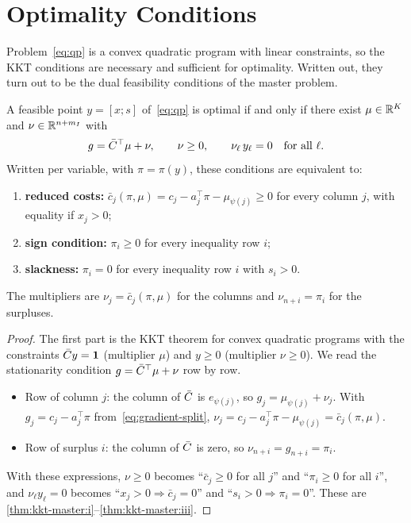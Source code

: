 \section{Optimality Conditions}
\label{sec:kkt}

Problem~\eqref{eq:qp} is a convex quadratic program with linear constraints, so the KKT
conditions are necessary and sufficient for optimality. Written out, they turn out to be the
dual feasibility conditions of the master problem.

\begin{theorem} \label{thm:kkt-master}
A feasible point $y = [x;s]$ of~\eqref{eq:qp} is optimal if and only if there exist
$\mu\in\mathbb{R}^K$ and $\nu\in\mathbb{R}^{n+m_I}$ with
\[
g = \bar{C}^\top\mu + \nu,\qquad \nu\ge0,\qquad \nu_\ell\,y_\ell = 0\quad\text{for all }\ell .
\]
Written per variable, with $\pi = \pi(y)$, these conditions are equivalent to:
\begin{enumerate}
    \item \label{thm:kkt-master:i} \textbf{reduced costs:} $\bar c_j(\pi,\mu) = c_j - a_j^\top\pi - \mu_{\psi(j)}\ge0$
          for every column $j$, with equality if $x_j>0$;
    \item \label{thm:kkt-master:ii} \textbf{sign condition:} $\pi_i\ge0$ for every inequality row $i$;
    \item \label{thm:kkt-master:iii} \textbf{slackness:} $\pi_i = 0$ for every inequality row $i$ with $s_i>0$.
\end{enumerate}
The multipliers are $\nu_j = \bar c_j(\pi,\mu)$ for the columns and $\nu_{n+i} = \pi_i$ for
the surpluses.
\end{theorem}

\begin{proof}
The first part is the KKT theorem for convex quadratic programs with the constraints
$\bar{C} y = \mathbf{1}$ (multiplier $\mu$) and $y\ge0$ (multiplier $\nu\ge0$). We read the
stationarity condition $g = \bar{C}^\top\mu + \nu$ row by row.
\begin{itemize}
    \item Row of column $j$: the column of $\bar{C}$ is $e_{\psi(j)}$, so $g_j = \mu_{\psi(j)} + \nu_j$.
          With $g_j = c_j - a_j^\top\pi$ from~\eqref{eq:gradient-split},
          $\nu_j = c_j - a_j^\top\pi - \mu_{\psi(j)} = \bar c_j(\pi,\mu)$.
    \item Row of surplus $i$: the column of $\bar{C}$ is zero, so $\nu_{n+i} = g_{n+i} = \pi_i$.
\end{itemize}
With these expressions, $\nu\ge0$ becomes ``$\bar c_j\ge0$ for all $j$'' and ``$\pi_i\ge0$ for
all $i$'', and $\nu_\ell y_\ell = 0$ becomes ``$x_j>0\Rightarrow\bar c_j = 0$'' and
``$s_i>0\Rightarrow\pi_i = 0$''. These are \ref{thm:kkt-master:i}--\ref{thm:kkt-master:iii}.
\end{proof}

